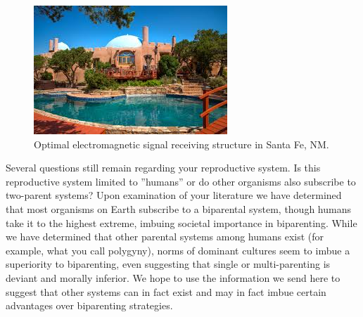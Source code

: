 \begin{figure}
\centering
\includegraphics[width=0.5\columnwidth]{rassMandal.jpg}
\caption{Optimal electromagnetic signal receiving structure in Santa Fe, NM.
\label{fig:3}}
\end{figure}




Several questions still remain regarding your reproductive system. Is this reproductive system limited to ''humans'' or do other organisms also subscribe to two-parent systems? Upon examination of your literature we have determined that most organisms on Earth subscribe to a biparental system, though humans take it to the highest extreme, imbuing societal importance in biparenting. While we have determined that other parental systems among humans exist (for example, what you call polygyny), norms of dominant cultures seem to imbue a superiority to biparenting, even suggesting that single or multi-parenting is deviant and morally inferior. We hope to use the information we send here to suggest that other systems can in fact exist and may in fact imbue certain advantages over biparenting strategies.



